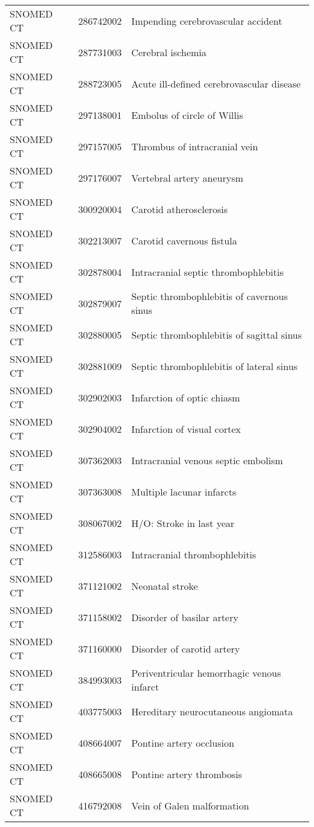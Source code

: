 \begin{longtable}{p{}p{}p{}}
  SNOMED CT & 286742002 & Impending cerebrovascular accident \\ 
  SNOMED CT & 287731003 & Cerebral ischemia \\ 
  SNOMED CT & 288723005 & Acute ill-defined cerebrovascular disease \\ 
  SNOMED CT & 297138001 & Embolus of circle of Willis \\ 
  SNOMED CT & 297157005 & Thrombus of intracranial vein \\ 
  SNOMED CT & 297176007 & Vertebral artery aneurysm \\ 
  SNOMED CT & 300920004 & Carotid atherosclerosis \\ 
  SNOMED CT & 302213007 & Carotid cavernous fistula \\ 
  SNOMED CT & 302878004 & Intracranial septic thrombophlebitis \\ 
  SNOMED CT & 302879007 & Septic thrombophlebitis of cavernous sinus \\ 
  SNOMED CT & 302880005 & Septic thrombophlebitis of sagittal sinus \\ 
  SNOMED CT & 302881009 & Septic thrombophlebitis of lateral sinus \\ 
  SNOMED CT & 302902003 & Infarction of optic chiasm \\ 
  SNOMED CT & 302904002 & Infarction of visual cortex \\ 
  SNOMED CT & 307362003 & Intracranial venous septic embolism \\ 
  SNOMED CT & 307363008 & Multiple lacunar infarcts \\ 
  SNOMED CT & 308067002 & H/O: Stroke in last year \\ 
  SNOMED CT & 312586003 & Intracranial thrombophlebitis \\ 
  SNOMED CT & 371121002 & Neonatal stroke \\ 
  SNOMED CT & 371158002 & Disorder of basilar artery \\ 
  SNOMED CT & 371160000 & Disorder of carotid artery \\ 
  SNOMED CT & 384993003 & Periventricular hemorrhagic venous infarct \\ 
  SNOMED CT & 403775003 & Hereditary neurocutaneous angiomata \\ 
  SNOMED CT & 408664007 & Pontine artery occlusion \\ 
  SNOMED CT & 408665008 & Pontine artery thrombosis \\ 
  SNOMED CT & 416792008 & Vein of Galen malformation \\ 

\end{longtable}
